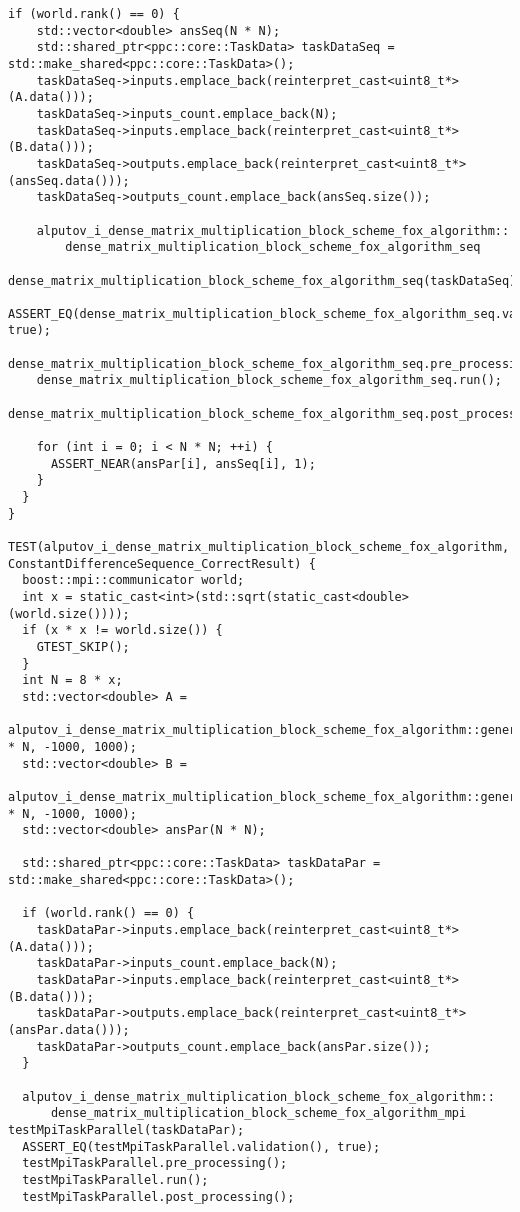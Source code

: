 \documentclass{report}
\begin{document}
\begin{lstlisting}[caption={main.cpp(func tests)},label=lst:opsmpi2]
  if (world.rank() == 0) {
    std::vector<double> ansSeq(N * N);
    std::shared_ptr<ppc::core::TaskData> taskDataSeq = std::make_shared<ppc::core::TaskData>();
    taskDataSeq->inputs.emplace_back(reinterpret_cast<uint8_t*>(A.data()));
    taskDataSeq->inputs_count.emplace_back(N);
    taskDataSeq->inputs.emplace_back(reinterpret_cast<uint8_t*>(B.data()));
    taskDataSeq->outputs.emplace_back(reinterpret_cast<uint8_t*>(ansSeq.data()));
    taskDataSeq->outputs_count.emplace_back(ansSeq.size());

    alputov_i_dense_matrix_multiplication_block_scheme_fox_algorithm::
        dense_matrix_multiplication_block_scheme_fox_algorithm_seq
            dense_matrix_multiplication_block_scheme_fox_algorithm_seq(taskDataSeq);
    ASSERT_EQ(dense_matrix_multiplication_block_scheme_fox_algorithm_seq.validation(), true);
    dense_matrix_multiplication_block_scheme_fox_algorithm_seq.pre_processing();
    dense_matrix_multiplication_block_scheme_fox_algorithm_seq.run();
    dense_matrix_multiplication_block_scheme_fox_algorithm_seq.post_processing();

    for (int i = 0; i < N * N; ++i) {
      ASSERT_NEAR(ansPar[i], ansSeq[i], 1);
    }
  }
}

TEST(alputov_i_dense_matrix_multiplication_block_scheme_fox_algorithm, ConstantDifferenceSequence_CorrectResult) {
  boost::mpi::communicator world;
  int x = static_cast<int>(std::sqrt(static_cast<double>(world.size())));
  if (x * x != world.size()) {
    GTEST_SKIP();
  }
  int N = 8 * x;
  std::vector<double> A =
      alputov_i_dense_matrix_multiplication_block_scheme_fox_algorithm::generator(N * N, -1000, 1000);
  std::vector<double> B =
      alputov_i_dense_matrix_multiplication_block_scheme_fox_algorithm::generator(N * N, -1000, 1000);
  std::vector<double> ansPar(N * N);

  std::shared_ptr<ppc::core::TaskData> taskDataPar = std::make_shared<ppc::core::TaskData>();

  if (world.rank() == 0) {
    taskDataPar->inputs.emplace_back(reinterpret_cast<uint8_t*>(A.data()));
    taskDataPar->inputs_count.emplace_back(N);
    taskDataPar->inputs.emplace_back(reinterpret_cast<uint8_t*>(B.data()));
    taskDataPar->outputs.emplace_back(reinterpret_cast<uint8_t*>(ansPar.data()));
    taskDataPar->outputs_count.emplace_back(ansPar.size());
  }

  alputov_i_dense_matrix_multiplication_block_scheme_fox_algorithm::
      dense_matrix_multiplication_block_scheme_fox_algorithm_mpi testMpiTaskParallel(taskDataPar);
  ASSERT_EQ(testMpiTaskParallel.validation(), true);
  testMpiTaskParallel.pre_processing();
  testMpiTaskParallel.run();
  testMpiTaskParallel.post_processing();


\end{lstlisting}
\end{document}
